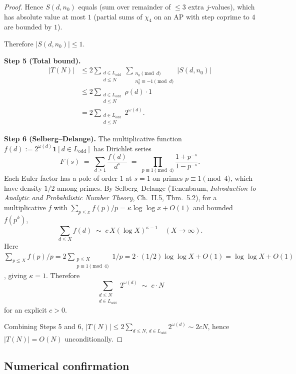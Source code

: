 \documentclass[11pt]{article}
\begin{document}
\begin{proof}
Hence $S(d, n_0)$ equals (sum over remainder of $\le 3$ extra $j$-values), which
has absolute value at most $1$ (partial sums of $\chi_4$ on an AP with step
coprime to $4$ are bounded by $1$).

Therefore $|S(d, n_0)| \le 1$.

\medskip
\noindent\textbf{Step 5 (Total bound).}
\begin{align*}
|T(N)| &\le 2 \sum_{\substack{d \in L_{\mathrm{odd}} \\ d \le N}}
\sum_{\substack{n_0 \pmod d \\ n_0^2 \equiv -1 \pmod d}} |S(d, n_0)| \\
&\le 2 \sum_{\substack{d \in L_{\mathrm{odd}} \\ d \le N}} \rho(d) \cdot 1 \\
&= 2 \sum_{\substack{d \in L_{\mathrm{odd}} \\ d \le N}} 2^{\omega(d)}.
\end{align*}

\medskip
\noindent\textbf{Step 6 (Selberg--Delange).} The multiplicative function
$f(d) := 2^{\omega(d)} \mathbf{1}[d \in L_{\mathrm{odd}}]$ has Dirichlet series
\[
F(s) \;=\; \sum_{d \ge 1} \frac{f(d)}{d^s}
\;=\; \prod_{p \equiv 1 \!\!\!\pmod 4} \frac{1 + p^{-s}}{1 - p^{-s}}.
\]
Each Euler factor has a pole of order $1$ at $s = 1$ on primes
$p \equiv 1 \pmod 4$, which have density $1/2$ among primes. By
Selberg--Delange (Tenenbaum, \emph{Introduction to Analytic and Probabilistic
Number Theory}, Ch.~II.5, Thm.~5.2), for a multiplicative $f$ with
$\sum_{p \le x} f(p)/p = \kappa \log\log x + O(1)$ and bounded $f(p^k)$,
\[
\sum_{d \le X} f(d) \;\sim\; c\,X (\log X)^{\kappa - 1}
\quad (X \to \infty).
\]
Here
$\sum_{p \le X} f(p)/p = 2 \sum_{\substack{p \le X \\ p \equiv 1 \!\pmod 4}}
1/p = 2 \cdot (1/2) \log \log X + O(1) = \log \log X + O(1)$,
giving $\kappa = 1$. Therefore
\[
\sum_{\substack{d \le N \\ d \in L_{\mathrm{odd}}}} 2^{\omega(d)} \;\sim\; c \cdot N
\]
for an explicit $c > 0$.

Combining Steps 5 and 6,
$|T(N)| \le 2 \sum_{d \le N,\, d \in L_{\mathrm{odd}}} 2^{\omega(d)} \sim 2cN$,
hence $|T(N)| = O(N)$ unconditionally.
\end{proof}

\subsection*{Numerical confirmation}
\end{document}
